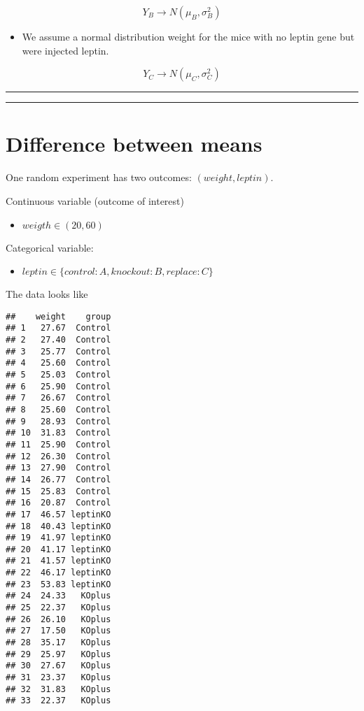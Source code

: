 \documentclass[
]{book}
\providecommand{\tightlist}{%
  \setlength{\itemsep}{0pt}\setlength{\parskip}{0pt}}
\begin{document}
\[Y_B \rightarrow N(\mu_B, \sigma_B^2)\]

\begin{itemize}
\tightlist
\item
  We assume a normal distribution weight for the mice with no leptin gene but were injected leptin.
\end{itemize}

\[Y_C \rightarrow N(\mu_C, \sigma_C^2)\]

\begin{center}\rule{0.5\linewidth}{0.5pt}\end{center}

\begin{center}\rule{0.5\linewidth}{0.5pt}\end{center}

\hypertarget{difference-between-means-8}{%
\section{Difference between means}\label{difference-between-means-8}}

One random experiment has two outcomes: \((weight, leptin)\).

Continuous variable (outcome of interest)

\begin{itemize}
\tightlist
\item
  \(weigth \in (20, 60)\)
\end{itemize}

Categorical variable:

\begin{itemize}
\tightlist
\item
  \(leptin \in \{control:A,knockout:B, replace:C\}\)
\end{itemize}

The data looks like

\begin{verbatim}
##    weight    group
## 1   27.67  Control
## 2   27.40  Control
## 3   25.77  Control
## 4   25.60  Control
## 5   25.03  Control
## 6   25.90  Control
## 7   26.67  Control
## 8   25.60  Control
## 9   28.93  Control
## 10  31.83  Control
## 11  25.90  Control
## 12  26.30  Control
## 13  27.90  Control
## 14  26.77  Control
## 15  25.83  Control
## 16  20.87  Control
## 17  46.57 leptinKO
## 18  40.43 leptinKO
## 19  41.97 leptinKO
## 20  41.17 leptinKO
## 21  41.57 leptinKO
## 22  46.17 leptinKO
## 23  53.83 leptinKO
## 24  24.33   KOplus
## 25  22.37   KOplus
## 26  26.10   KOplus
## 27  17.50   KOplus
## 28  35.17   KOplus
## 29  25.97   KOplus
## 30  27.67   KOplus
## 31  23.37   KOplus
## 32  31.83   KOplus
## 33  22.37   KOplus
\end{verbatim}
\end{document}
